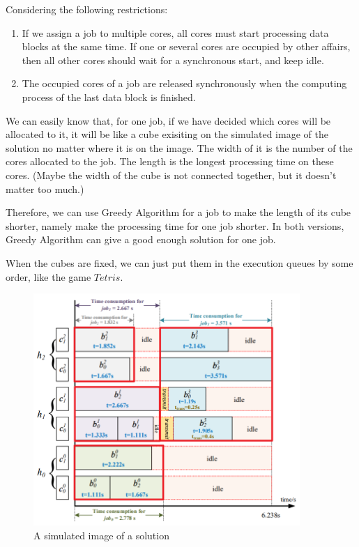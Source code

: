 \documentclass{llncs}
\begin{document}
	Considering the following restrictions: 
	\begin{enumerate}
		\item If we assign a job to multiple cores, all cores must start processing data blocks at the same time. If one or several cores are occupied by other affairs, then all other cores should wait for a synchronous start, and keep idle.
		\item The occupied cores of a job are released synchronously when the computing process of the last data block is finished.
	\end{enumerate}
	We can easily know that, for one job, if we have decided which cores will be allocated to it, it will be like a cube exisiting on the simulated image of the solution no matter where it is on the image. The width of it is the number of the cores allocated to the job. The length is the longest processing time on these cores. (Maybe the width of the cube is not connected together, but it doesn't matter too much.) 
	
	Therefore, we can use Greedy Algorithm for a job to make the length of its cube shorter, namely make the processing time for one job shorter. In both versions, Greedy Algorithm can give a good enough solution for one job.
	
	When the cubes are fixed, we can just put them in the execution queues by some order, like the game $Tetris$.
	
	\begin{figure}[H]
		\begin{center}
			\includegraphics[width=0.9\textwidth]{Fig-CubeLike.png}
			\caption{A simulated image of a solution}
			\label{Fig-Cube}
		\end{center}
	\end{figure}
	
\end{document}
